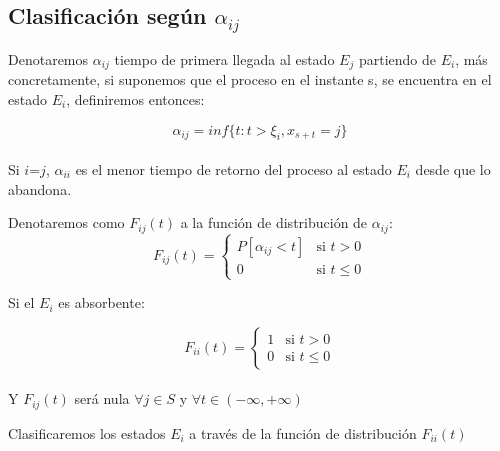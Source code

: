 \documentclass[12pt,a4paper]{article}
\begin{document}
		
\subsection{Clasificación según \textbf{$\alpha_{ij}$}}
 Denotaremos $\alpha_{ij}$ tiempo de primera llegada al estado $E_{j}$ partiendo de $E_{i}$, más concretamente, si suponemos que el proceso en el instante s, se encuentra en el estado $E_{i}$, definiremos entonces: 
 
	 \begin{equation*}
 \alpha_{ij}=inf \{ t: t>\xi_{i}, x_{s+t}=j \}
	 \end{equation*}
 \\
 
 Si $i$=$j$, $\alpha_{ii}$ es el menor tiempo de retorno del proceso al estado $E_{i}$ desde que lo abandona.
 
 \begin{definition} Denotaremos como $F_{ij}(t)$ a la función de distribución de $\alpha_{ij}$:
 	\begin{equation*}
 		F_{ij}(t) = \left\{
 		\begin{array}{cl}
 			P[\alpha_{ij}<t]&\mbox{si } t > 0\\
 			0&\mbox{si } t\leq 0
 		\end{array}\right.
 	\end{equation*}
 \end{definition}
  
  \begin{definition} Si el $E_{i}$ es absorbente: 
  	
  	\begin{equation*}
  		F_{ii}(t) = \left\{
  		\begin{array}{cl}
  		1&\mbox{si } t > 0\\
  			0&\mbox{si } t\leq 0
  		\end{array}\right.
  	\end{equation*}
  	   		\\
  Y $F_{ij}(t)$ será nula  $\forall j \in S$ y $\forall t \in (-\infty,+\infty)$
    \end{definition}
    \begin{flushleft}
    	Clasificaremos los estados $E_{i}$ a través de la función de distribución $F_{ii}(t)$
    \end{flushleft}
    
\end{document}
